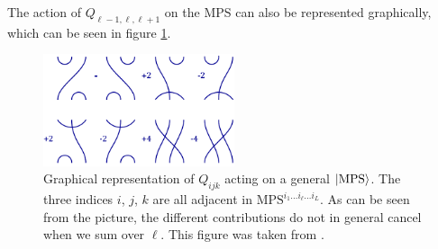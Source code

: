 %
%
The action of $Q_{\ell-1,\ell,\ell+1}$ on the MPS can also be represented graphically, which can be seen in figure \ref{fig:Q3_on_MPS}.
%
%
\begin{figure}
%
\begin{center}
%
\includegraphics[width=0.5\textwidth]{../pics/Q3_on_MPS.png}
%
\caption[Graphical representation of $Q_{ijk}$ acting on a general $\ket{\text{MPS}}$]{Graphical representation of $Q_{ijk}$ acting on a general $\ket{\text{MPS}}$. The three indices $i$, $j$, $k$ are  all adjacent in $\text{MPS}^{i_1 \ldots i_{\ell} \ldots i_L}$. As can be seen from the picture, the different contributions do not in general cancel when we sum over $\ell$. This figure was taken from \cite{MPS bethe state overlap SO(5)}.}
%
\label{fig:Q3_on_MPS}
%
\end{center}
%
\end{figure}
%
%

